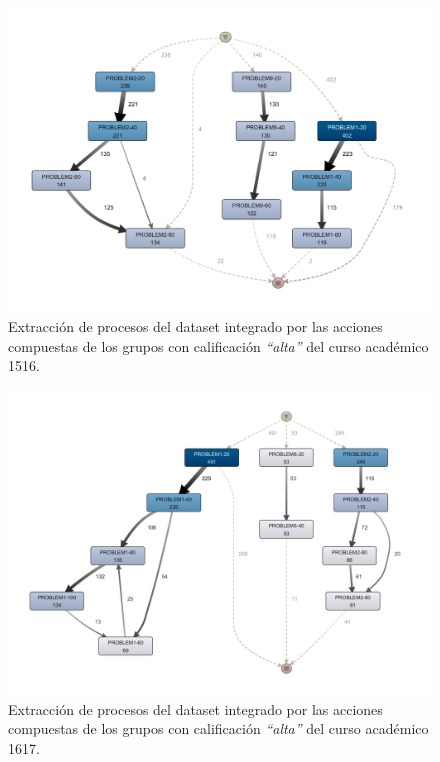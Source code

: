 \begin{figure}[H]
    \centering
    \includegraphics[width=1.25\textwidth]{imagenes/DISCO_compound/Year1516HighGrades.png}
    \caption{Extracción de procesos del dataset integrado por las acciones compuestas de los grupos con calificación \emph{``alta''} del curso académico 1516.}
    \label{fig:year1516BestGrades}
\end{figure}

\begin{figure}[H]
    \centering
    \includegraphics[width=1.25\textwidth]{imagenes/DISCO_compound/Year1617HighGrades.png}
    \caption{Extracción de procesos del dataset integrado por las acciones compuestas de los grupos con calificación \emph{``alta''} del curso académico 1617.}
    \label{fig:year1617BestGrades}
\end{figure}

